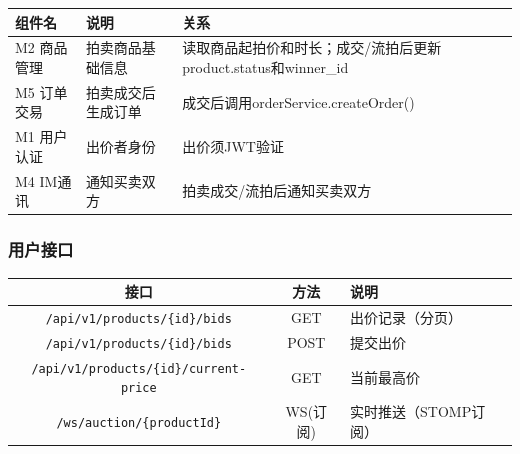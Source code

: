 \documentclass[12pt,a4paper]{ctexart}
\numberwithin{figure}{section}
\numberwithin{table}{section}
\begin{document}
\begin{center}
\renewcommand{\arraystretch}{1.3}
\begin{tabular}{|p{3cm}|p{4cm}|p{7cm}|}
\hline
\rowcolor{tableheader}
\textbf{组件名} & \textbf{说明} & \textbf{关系} \\
\hline
M2 商品管理 & 拍卖商品基础信息 & 读取商品起拍价和时长；成交/流拍后更新product.status和winner\_id \\
\hline
M5 订单交易 & 拍卖成交后生成订单 & 成交后调用orderService.createOrder() \\
\hline
M1 用户认证 & 出价者身份 & 出价须JWT验证 \\
\hline
M4 IM通讯 & 通知买卖双方 & 拍卖成交/流拍后通知买卖双方 \\
\hline
\end{tabular}
\end{center}

\subsubsection{用户接口}

\begin{center}
\renewcommand{\arraystretch}{1.3}
\begin{tabular}{|c|c|p{6cm}|}
\hline
\rowcolor{tableheader}
\textbf{接口} & \textbf{方法} & \textbf{说明} \\
\hline
\verb|/api/v1/products/{id}/bids| & GET & 出价记录（分页） \\
\hline
\verb|/api/v1/products/{id}/bids| & POST & 提交出价 \\
\hline
\verb|/api/v1/products/{id}/current-price| & GET & 当前最高价 \\
\hline
\verb|/ws/auction/{productId}| & WS(订阅) & 实时推送（STOMP订阅） \\
\hline
\end{tabular}
\end{center}
\end{document}

